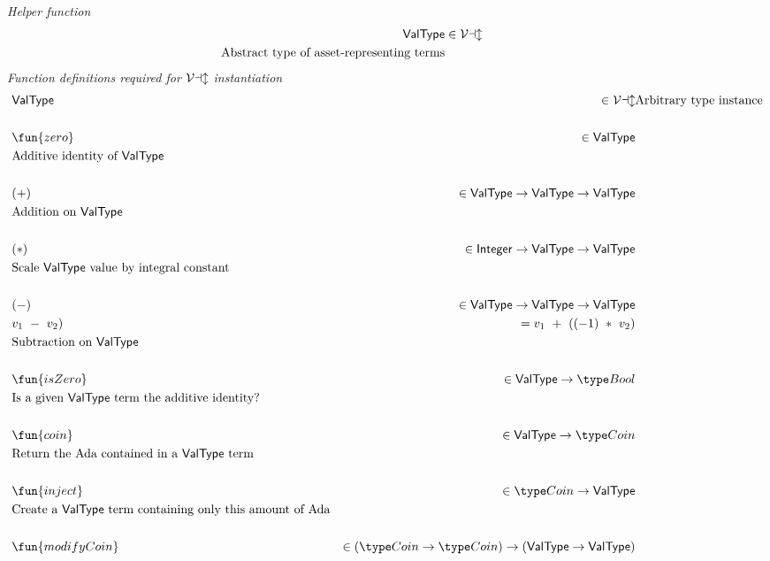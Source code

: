 \begin{figure}[htb]
  \emph{Helper function}
  \begin{align*}
    \mathsf{ValType} &\in \mathcal{Val}  \\
    \text{Abstract type of asset-representing terms}
  \end{align*}
  \emph{Function definitions required for $\mathcal{Val}$ instantiation}
  \begin{align*}
      & \mathsf{ValType} &\in \ValClass & \text{Arbitrary type instance} \\~\\
      & \fun{zero} &\in \mathsf{ValType} \\
      & \text{Additive identity of $\mathsf{ValType}$}\\~\\
      & (+) &\in \mathsf{ValType} \to \mathsf{ValType} \to \mathsf{ValType}\\
      & \text{Addition on $\mathsf{ValType}$}\\~\\
      & (*) &\in \mathsf{Integer} \to \mathsf{ValType} \to \mathsf{ValType}\\
      & \text{Scale $\mathsf{ValType}$ value by integral constant}\\~\\
      & (-) &\in \mathsf{ValType} \to \mathsf{ValType} \to \mathsf{ValType}\\
      & v_1~-~v_2) &= v_1~+~((-1)~*~v_2)\\
      & \text{Subtraction on $\mathsf{ValType}$}\\~\\
      & \fun{isZero} &\in \mathsf{ValType} \to \Bool\\
      & \text{Is a given $\mathsf{ValType}$ term the additive identity?}\\~\\
      & \fun{coin} &\in \mathsf{ValType} \to \Coin\\
      & \text{Return the Ada contained in a $\mathsf{ValType}$ term}\\~\\
      & \fun{inject} &\in \Coin \to \mathsf{ValType}\\
      & \text{Create a $\mathsf{ValType}$ term containing only this amount of Ada}\\~\\
      & \fun{modifyCoin} &\in (\Coin \to \Coin) \to (\mathsf{ValType} \to \mathsf{ValType})\\

\end{align*}
\end{figure}
